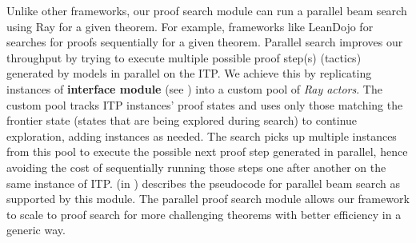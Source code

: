 Unlike other frameworks, our proof search module can run a parallel beam search using Ray \citep{moritz2018ray} for a given theorem. For example, frameworks like LeanDojo \citep{yang2023leandojo} for \lean{} searches for proofs sequentially for a given theorem. Parallel search improves our throughput by trying to execute multiple possible proof step(s) (tactics) generated by \proofwala\; models in parallel on the ITP. We achieve this by replicating instances of \textbf{interface module} (see ) into a custom pool of \emph{Ray actors}. The custom pool tracks ITP instances' proof states and uses only those matching the frontier state (states that are being explored during search) to continue exploration, adding instances as needed. The search picks up multiple instances from this pool to execute the possible next proof step generated in parallel, hence avoiding the cost of sequentially running those steps one after another on the same instance of ITP.  (in ) describes the pseudocode for parallel beam search as supported by this module. The parallel proof search module allows our framework to scale to proof search for more challenging theorems with better efficiency in a generic way. 


